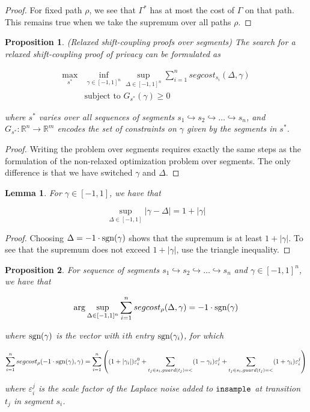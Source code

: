 \documentclass{article}
\newcommand{\R}{\mathbb{R}}
\newtheorem{proposition}{Proposition}[section]
\newtheorem{lemma}[theorem]{Lemma}
\renewcommand{\epsilon}{\varepsilon}
\newcommand{\sgn}{\textup{sgn}}
\newcommand{\insample}{\textup{\texttt{insample}}}
\newcommand{\1}{\langle 1 \rangle}
\newcommand{\2}{\langle 2 \rangle}
\begin{document}
\begin{proof}
    For fixed path $\rho$, we see that $\Gamma^*$ has at most the cost of $\Gamma$ on that path. This remains true when we take the supremum over all paths $\rho$.
\end{proof}

\begin{proposition}
    (Relaxed shift-coupling proofs over segments) The search for a relaxed shift-coupling proof of privacy can be formulated as

    \begin{align*}
        \max_{s^*} &\inf_{\gamma \in [-1, 1]^n} \sup_{\Delta \in [-1, 1]^{n}}\sum_{i = 1}^n segcost_{s_i}(\Delta, \gamma) \\ 
        &\text{subject to } G_{s^*}(\gamma) \geq 0
    \end{align*}

    where $s^*$ varies over all sequences of segments $s_1 \hookrightarrow s_2 \hookrightarrow \dots \hookrightarrow s_n$, and $G_{s^*} : \R^n \to \R^m$ encodes the set of constraints on $\gamma$ given by the segments in $s^*$. 
\end{proposition}

\begin{proof}
    Writing the problem over segments requires exactly the same steps as the formulation of the non-relaxed optimization problem over segments. The only difference is that we have switched $\gamma$ and $\Delta$. 
\end{proof}

\begin{lemma}
    \label{lemma:solved_delta_relaxed_shifts}
    For $\gamma \in [-1, 1]$, we have that 

    \[\sup_{\Delta \in [-1, 1]} |\gamma - \Delta| = 1 + |\gamma|\]
\end{lemma}

\begin{proof}
    Choosing $\Delta = -1 \cdot \sgn(\gamma)$ shows that the supremum is at least $1 + |\gamma|$. To see that the supremum does not exceed $1 + |\gamma|$, use the triangle inequality.
\end{proof}

\begin{proposition}
    For sequence of segments $s_1 \hookrightarrow s_2 \hookrightarrow \dots \hookrightarrow s_n$ and $\gamma \in [-1, 1]^n$, we have that

    \[\arg \sup_{\Delta \in [-1, 1]^n} \sum_{i = 1}^n segcost_\rho(\Delta, \gamma) = -1 \cdot \sgn(\gamma)\]

    where $\sgn(\gamma)$ is the vector with $i$th entry $\sgn(\gamma_i)$, for which 

    \[\sum_{i = 1}^n segcost_\rho(-1 \cdot \sgn(\gamma), \gamma) = \sum_{i = 1}^n \left((1 + |\gamma_i|)\epsilon_i^0 + \sum_{t_j \in s_i, guard(t_j) = <} (1 - \gamma_i) \epsilon_i^j +\sum_{t_j \in s_i, guard(t_j) = <} (1 + \gamma_i) \epsilon_i^j \right) \]

    where $\epsilon_i^j$ is the scale factor of the Laplace noise added to $\insample$ at transition $t_j$ in segment $s_i$.
\end{proposition}
\end{document}
